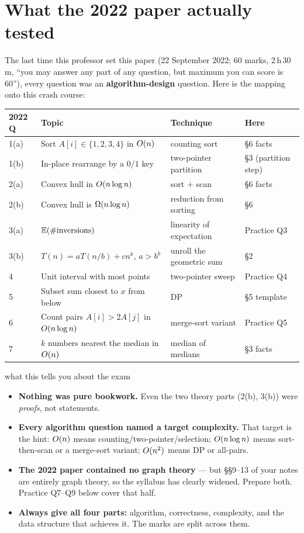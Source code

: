 \section{What the 2022 paper actually tested}

The last time this professor set this paper (22 September 2022; 60 marks, 2\,h\,30\,m, ``you may
answer any part of any question, but maximum you can score is 60''), every question was an
\textbf{algorithm-design} question. Here is the mapping onto this crash course:

\begin{center}
\begin{tabular}{@{}llll@{}}
\toprule
2022 Q & Topic & Technique & Here \\
\midrule
1(a) & Sort $A[i]\in\{1,2,3,4\}$ in $O(n)$ & counting sort & \S6 facts \\
1(b) & In-place rearrange by a $0/1$ key & two-pointer partition & \S3 (partition step) \\
2(a) & Convex hull in $O(n\log n)$ & sort $+$ scan & \S6 facts \\
2(b) & Convex hull is $\Omega(n\log n)$ & reduction from sorting & \S6 \\
3(a) & $\mathbb{E}(\#\text{inversions})$ & linearity of expectation & Practice Q3 \\
3(b) & $T(n)=aT(n/b)+cn^k$, $a>b^k$ & unroll the geometric sum & \S2 \\
4 & Unit interval with most points & two-pointer sweep & Practice Q4 \\
5 & Subset sum closest to $x$ from below & DP & \S5 template \\
6 & Count pairs $A[i]>2A[j]$ in $O(n\log n)$ & merge-sort variant & Practice Q5 \\
7 & $k$ numbers nearest the median in $O(n)$ & median of medians & \S3 facts \\
\bottomrule
\end{tabular}
\end{center}

\begin{facts}{what this tells you about the exam}
\begin{itemize}
  \item \textbf{Nothing was pure bookwork.} Even the two theory parts (2(b), 3(b)) were
        \emph{proofs}, not statements.
  \item \textbf{Every algorithm question named a target complexity.} That target is the hint:
        $O(n)$ means counting/two-pointer/selection; $O(n\log n)$ means sort-then-scan or a
        merge-sort variant; $O(n^2)$ means DP or all-pairs.
  \item \textbf{The 2022 paper contained no graph theory} --- but \S\S9--13 of your notes are
        entirely graph theory, so the syllabus has clearly widened. Prepare both. Practice
        Q7--Q9 below cover that half.
  \item \textbf{Always give all four parts:} algorithm, correctness, complexity, and the
        data structure that achieves it. The marks are split across them.
\end{itemize}
\end{facts}

